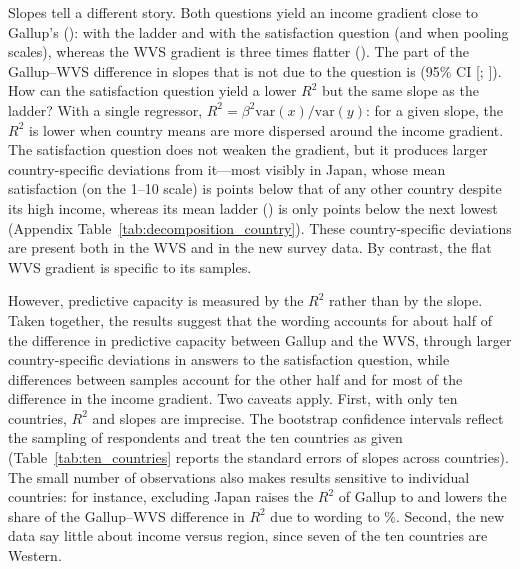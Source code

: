 \documentclass[12pt]{article}
\begin{document}
Slopes tell a different story. Both questions yield an income gradient close to Gallup's (\slopeTenGallup): \slopeTenFabreLadder with the ladder and \slopeTenFabreSatisfaction with the satisfaction question (\slopeTenFabreLadderPooled and \slopeTenFabreSatisfactionPooled when pooling scales), whereas the WVS gradient is three times flatter (\slopeTenWVS). The part of the Gallup--WVS difference in slopes that is not due to the question is \SlopeDiffinDiff (95\% CI [\SlopeDiffinDiffLow; \SlopeDiffinDiffHigh]). How can the satisfaction question yield a lower $R^2$ but the same slope as the ladder? With a single regressor, $R^2 = \beta^2 \mathrm{var}(x)/\mathrm{var}(y)$: for a given slope, the $R^2$ is lower when country means are more dispersed around the income gradient. The satisfaction question does not weaken the gradient, but it produces larger country-specific deviations from it---most visibly in Japan, whose mean satisfaction (\meanSatisfactionJPN on the 1--10 scale) is \gapSatisfactionJPN points below that of any other country despite its high income, whereas its mean ladder (\meanLadderJPN) is only \gapLadderJPN points below the next lowest (Appendix Table~\ref{tab:decomposition_country}). These country-specific deviations are present both in the WVS and in the new survey data. By contrast, the flat WVS gradient is specific to its samples.

However, predictive capacity is measured by the $R^2$ rather than by the slope. Taken together, the results suggest that the wording accounts for about half of the difference in predictive capacity between Gallup and the WVS, through larger country-specific deviations in answers to the satisfaction question, while differences between samples account for the other half and for most of the difference in the income gradient. Two caveats apply. First, with only ten countries, $R^2$ and slopes are imprecise. The bootstrap confidence intervals reflect the sampling of respondents and treat the ten countries as given (Table~\ref{tab:ten_countries} reports the standard errors of slopes across countries). The small number of observations also makes results sensitive to individual countries: for instance, excluding Japan raises the $R^2$ of Gallup to \RtwoGallupNoJPN and lowers the share of the Gallup--WVS difference in $R^2$ due to wording to \shareRtwoWordingPooledNoJPN\%. Second, the new data say little about income versus region, since seven of the ten countries are Western.
\end{document}
